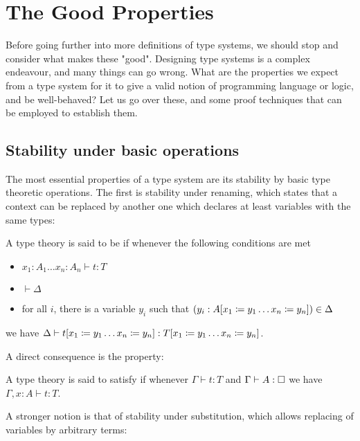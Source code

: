 \section{The Good Properties}
\label{sec:tech-properties}

Before going further into more definitions of type systems, we should stop and consider
what makes these "good". Designing type systems is a complex endeavour,
and many things can go wrong. What are the properties we expect from a type
system for it to give a valid notion of programming language or logic, and be well-behaved?
Let us go over these, and some proof techniques that can be employed to establish them.

\subsection{Stability under basic operations}

The most essential properties of a type system are its stability
by basic type theoretic operations.
The first is stability under renaming, which states that a context can be replaced by another
one which declares at least variables with the same types:

\begin{property}
  \label{prop:stab-renaming}
  A type theory is said to be 
  if whenever the following conditions are met
  \begin{itemize}
    \item $x_1 : A_1 \dots x_n : A_n \vdash t : T$
    \item $\vdash \Delta$
    \item for all $i$, there is a variable $y_i$ such that $(y_i : A[x_1 \coloneqq y_1 \dots x_n \coloneqq y_n]) \in \Delta$
  \end{itemize} 
  we have $\Delta \vdash t[x_1 \coloneqq y_1 \dots x_n \coloneqq y_n] : T[x_1 \coloneqq y_1 \dots x_n \coloneqq y_n]$.
\end{property}

A direct consequence is the  property:

\begin{property}[Weakening]
  \label{prop:weakening}
  A type theory is said to satisfy  if whenever $\Gamma \vdash t : T$
  and $\Gamma \vdash A : \uni$ we have $\Gamma, x : A \vdash t : T$.
\end{property}

A stronger notion is that of stability under substitution, which allows replacing of
variables by arbitrary terms:

